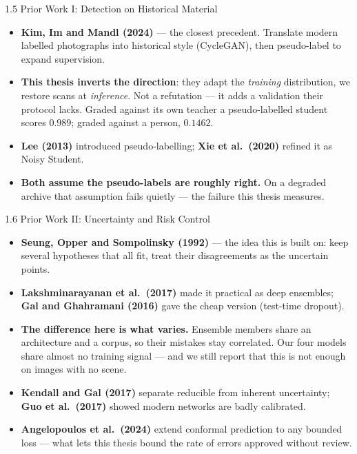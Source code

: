 \documentclass[aspectratio=169,11pt]{beamer}
\begin{document}
\begin{frame}{1.5 Prior Work I: Detection on Historical Material}
\footnotesize
\begin{itemize}
  \setlength\itemsep{6pt}
  \item \textbf{Kim, Im and Mandl (2024)} --- the closest precedent. Translate modern labelled photographs into historical style (CycleGAN), then pseudo-label to expand supervision.
  \item \textbf{This thesis inverts the direction}: they adapt the \emph{training} distribution, we restore scans at \emph{inference}. Not a refutation --- it adds a validation their protocol lacks. Graded against its own teacher a pseudo-labelled student scores $\mathbf{0.989}$; graded against a person, $\mathbf{0.1462}$.
  \item \textbf{Lee (2013)} introduced pseudo-labelling; \textbf{Xie et al.\ (2020)} refined it as Noisy Student.
  \item \textbf{Both assume the pseudo-labels are roughly right.} On a degraded archive that assumption fails quietly --- the failure this thesis measures.
\end{itemize}
\end{frame}

\begin{frame}{1.6 Prior Work II: Uncertainty and Risk Control}
\footnotesize
\begin{itemize}
  \setlength\itemsep{6pt}
  \item \textbf{Seung, Opper and Sompolinsky (1992)} --- the idea this is built on: keep several hypotheses that all fit, treat their disagreements as the uncertain points.
  \item \textbf{Lakshminarayanan et al.\ (2017)} made it practical as deep ensembles; \textbf{Gal and Ghahramani (2016)} gave the cheap version (test-time dropout).
  \item \textbf{The difference here is what varies.} Ensemble members share an architecture and a corpus, so their mistakes stay correlated. Our four models share almost no training signal --- and we still report that this is not enough on images with no scene.
  \item \textbf{Kendall and Gal (2017)} separate reducible from inherent uncertainty; \textbf{Guo et al.\ (2017)} showed modern networks are badly calibrated.
  \item \textbf{Angelopoulos et al.\ (2024)} extend conformal prediction to any bounded loss --- what lets this thesis bound the rate of errors approved without review.
\end{itemize}
\end{frame}
\end{document}

